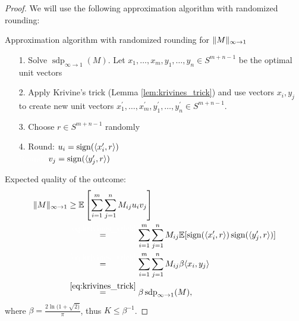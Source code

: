 	\begin{proof}
		We will use the following approximation algorithm with randomized rounding:
		
		\begin{algorithm}[H]
			\SetAlgoLined
			\caption{Approximation algorithm with randomized rounding for $ \Vert {M} \Vert_{\infty\to 1}$}
		\end{algorithm}
		\begin{itemize}
			\item[1.] Solve $\operatorname{sdp}_{\infty\to 1} (M)$. Let $x_1,\dots,x_m,y_1,\dots,y_n\in S^{m+n-1}$ be the optimal unit vectors
			\item[2.] Apply Krivine's trick (Lemma \ref{lem:krivines_trick}) and use vectors $x_i,y_j$ to create new unit vectors $x_1^\prime,\dots,x_m^\prime, y_1^\prime,\dots,y_n^\prime\in S^{m+n-1}$.
			\item[3.] Choose $r\in S^{m+n-1}$ randomly
			\item[4.] Round: $u_i = \operatorname{sign}(\langle{x_i^\prime},{r}\rangle)$\\
						\textcolor{white}{Round: }$v_j = \operatorname{sign}(\langle{y_j^\prime},{r}\rangle)$
		\end{itemize}
		
		\noindent Expected quality of the outcome:
		\begin{align*}
			\norm{M}_{\infty\to 1} &\geq \mathbb{E}\left[\sum_{i=1}^m\sum_{j=1}^n M_{ij}u_iv_j\right]\\
			&\overset{\textcolor{white}{\eqref*{eq:krivines_trick}}}{=} \sum_{i=1}^m\sum_{j=1}^n M_{ij} \mathbb{E}[\sgn(\sclr{x_i^\prime}{r}) \sgn(\sclr{y_j^\prime}{r})] \\
			&\overset{\textcolor{white}{\eqref*{eq:krivines_trick}}}{=}\sum_{i=1}^m\sum_{j=1}^n M_{ij}\beta \sclr{x_i}{y_j} \\
			&\overset{\eqref{eq:krivines_trick}}{=}\beta \operatorname{sdp}_{\infty\to 1}(M),
		\end{align*}
		where $\beta = \frac{2\ln(1+\sqrt{2)}}{\pi}$, thus $K\leq \beta^{-1}$.
	\end{proof}

